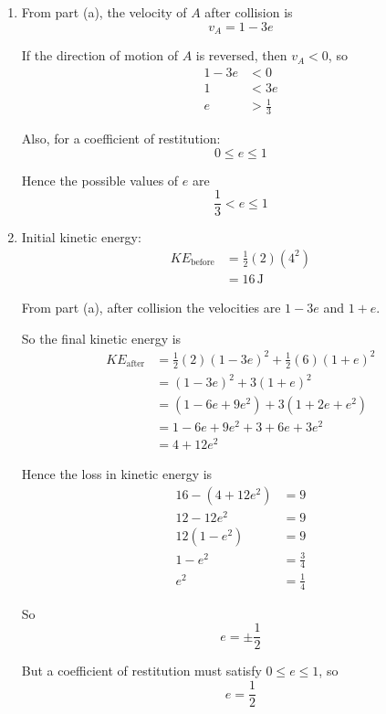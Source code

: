 \documentclass[leqno]{article}
\begin{document}
\begin{enumerate}[
  label=\textbf{\arabic*.},
  leftmargin=*,
  topsep=0pt,
  partopsep=0pt,
  parsep=0pt
]
\begin{djsSolution}
\begin{enumerate}[label=\textbf{(\alph*)}]
\begin{enumerate}[label=(\roman*)]
    \item From part (a), the velocity of $A$ after collision is
\[
v_A=1-3e
\]

If the direction of motion of $A$ is reversed, then $v_A<0$, so
\begin{align*}
1-3e&<0 \\
1&<3e \\
e&>\frac13
\end{align*}

Also, for a coefficient of restitution:
\[
0\le e\le 1
\]

Hence the possible values of $e$ are
\[
\frac13<e\le 1
\]

    \item Initial kinetic energy:
\begin{align*}
KE_{\text{before}}&=\frac12(2)(4^2) \\
&=16\,\mathrm{J}
\end{align*}

From part (a), after collision the velocities are $1-3e$ and $1+e$.

So the final kinetic energy is
\begin{align*}
KE_{\text{after}}
&=\frac12(2)(1-3e)^2+\frac12(6)(1+e)^2 \\
&=(1-3e)^2+3(1+e)^2 \\
&=(1-6e+9e^2)+3(1+2e+e^2) \\
&=1-6e+9e^2+3+6e+3e^2 \\
&=4+12e^2
\end{align*}

Hence the loss in kinetic energy is
\begin{align*}
16-(4+12e^2)&=9 \\
12-12e^2&=9 \\
12(1-e^2)&=9 \\
1-e^2&=\frac34 \\
e^2&=\frac14
\end{align*}

So
\[
e=\pm \frac12
\]

But a coefficient of restitution must satisfy $0\le e\le 1$, so
\[
e=\frac12
\]

  \end{enumerate}
\end{enumerate}
\end{djsSolution}


\newpage

\questionitem


\end{enumerate}
\end{document}
